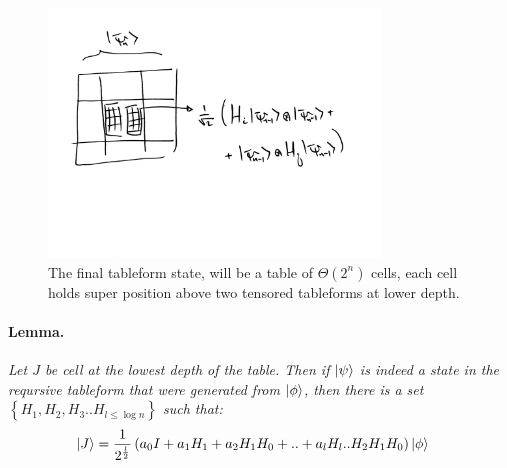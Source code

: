 \documentclass{article}
\newcommand{\PSI}{{\ket{\psi}}}
\begin{document}
\begin{multicols*}{2}
\begin{figure}[H]
  \centering
    \includegraphics[width = 250pt]{outputt.jpg}
    \caption{The final tableform state, will be a table of \(\Theta(2^n)\) cells, each cell holds super position above two tensored tableforms at lower depth.}
    \label{fig:construction}
\end{figure}

\paragraph{Lemma.} \textit{Let \(J\) be cell at the lowest depth of the table. Then if \(\PSI\) is indeed a state in the reqursive tableform that were generated from \(\ket{\phi}\), then there is a set \( \left\{ H_1 , H_2 , H_3 .. H_{l \le \log n} \right\} \) such that:
\begin{equation*}
    \begin{split}
        \ket{J} &=  \frac{1}{2^{\frac{l}{2}}}\left(a_{0}I + a_{1}H_{1} + a_{2}H_{1}H_{0} + .. + a_{l}H_{l}..H_{2}H_{1}H_{0}\right)\ket{\phi} 
    \end{split}
\end{equation*} }



\end{multicols*}
\end{document}
